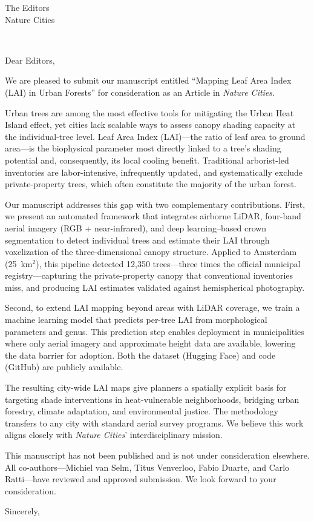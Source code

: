 \documentclass[11pt]{letter}
\date{\today}
\renewcommand{\opening}[1]{\thispagestyle{firstpage}%
  {\raggedright\toname \\ \toaddress \par}%
  \vspace{0.5\baselineskip}\noindent#1\par\noindent}
\begin{document}
\begin{letter}{The Editors\\Nature Cities}

\opening{Dear Editors,}

We are pleased to submit our manuscript entitled ``Mapping Leaf Area Index (LAI) in Urban Forests'' for consideration as an Article in \textit{Nature Cities}.

Urban trees are among the most effective tools for mitigating the Urban Heat Island effect, yet cities lack scalable ways to assess canopy shading capacity at the individual-tree level. Leaf Area Index (LAI)---the ratio of leaf area to ground area---is the biophysical parameter most directly linked to a tree's shading potential and, consequently, its local cooling benefit. Traditional arborist-led inventories are labor-intensive, infrequently updated, and systematically exclude private-property trees, which often constitute the majority of the urban forest.

Our manuscript addresses this gap with two complementary contributions. First, we present an automated framework that integrates airborne LiDAR, four-band aerial imagery (RGB + near-infrared), and deep learning--based crown segmentation to detect individual trees and estimate their LAI through voxelization of the three-dimensional canopy structure. Applied to Amsterdam (25~km$^2$), this pipeline detected 12,350 trees---three times the official municipal registry---capturing the private-property canopy that conventional inventories miss, and producing LAI estimates validated against hemispherical photography.

Second, to extend LAI mapping beyond areas with LiDAR coverage, we train a machine learning model that predicts per-tree LAI from morphological parameters and genus. This prediction step enables deployment in municipalities where only aerial imagery and approximate height data are available, lowering the data barrier for adoption. Both the dataset (Hugging Face) and code (GitHub) are publicly available.

The resulting city-wide LAI maps give planners a spatially explicit basis for targeting shade interventions in heat-vulnerable neighborhoods, bridging urban forestry, climate adaptation, and environmental justice. The methodology transfers to any city with standard aerial survey programs. We believe this work aligns closely with \textit{Nature Cities}' interdisciplinary mission.

This manuscript has not been published and is not under consideration elsewhere. All co-authors---Michiel van Selm, Titus Venverloo, Fabio Duarte, and Carlo Ratti---have reviewed and approved submission. We look forward to your consideration.

\closing{Sincerely,}

\end{letter}
\end{document}
